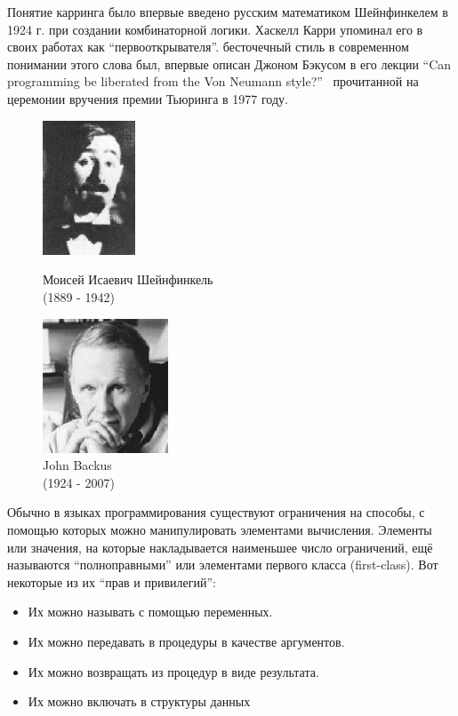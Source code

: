 \documentclass[a4paper,11pt]{article}
\begin{document}
Понятие карринга было впервые введено русским математиком Шейнфинкелем в
1924 г. при создании комбинаторной логики. Хаскелл Карри упоминал его в своих 
работах как ``первооткрывателя''. бесточечный стиль в современном понимании
этого слова был, впервые описан Джоном Бэкусом в его лекции ``Can programming
be liberated from the Von Neumann style?''~\cite{Backus} прочитанной на
церемонии вручения премии Тьюринга в 1977 году. 
\begin{figure}[h]
  \begin{minipage}[h]{0.49\linewidth}
    \begin{center}
        \includegraphics[height=40mm]{lecture3/schonfinkel.eps}
        \caption{Моисей Исаевич Шейнфинкель\\(1889 - 1942)}
    \end{center}
  \end{minipage}
  \begin{minipage}[h]{0.49\linewidth}
    \begin{center}
      \includegraphics[height=40mm]{lecture3/backus.eps}
      \caption{John Backus\\(1924 - 2007)}
    \end{center}
  \end{minipage}
\end{figure}

Обычно в языках программирования существуют ограничения на способы, с помощью
которых можно манипулировать элементами вычисления. Элементы или значения, на
которые накладывается наименьшее число ограничений, ещё называются
``полноправными'' или элементами первого класса (first-class). Вот некоторые из
их ``прав и  привилегий'':
\begin{itemize}
\item Их можно называть с помощью переменных.
\item Их можно передавать в процедуры в качестве аргументов.
\item Их можно возвращать из процедур в виде результата.
\item Их можно включать в структуры данных
\end{itemize}
\nocite{*}


\end{document}
